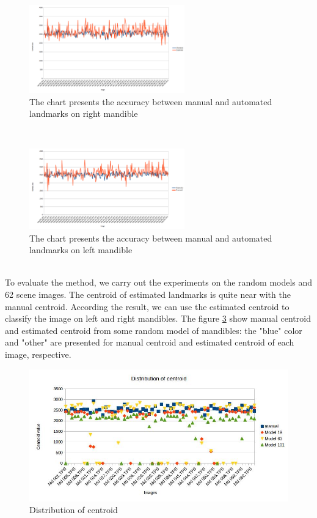 \begin{figure}[h]
\centering
\includegraphics[width=0.6\textwidth]{./images/MdChart}
\caption{The chart presents the accuracy between manual and automated landmarks on right mandible}
\label{figMdChart}
\end{figure}~\\
\begin{figure}[h]
\centering
\includegraphics[width=0.6\textwidth]{./images/MgChart}
\caption{The chart presents the accuracy between manual and automated landmarks on left mandible}
\label{figMgChart}
\end{figure}~\\
To evaluate the method, we carry out the experiments on the random models and 62 scene images. The centroid of estimated landmarks is quite near with the manual centroid. According the result, we can use the estimated centroid to classify the image on left and right mandibles. The figure \ref{figstatistic1} show manual centroid and estimated centroid from some random model of mandibles: the "blue" color and "other" are presented for manual centroid and estimated centroid of each image, respective.
\begin{figure}[h!]
	\centering
	\includegraphics[scale=0.6]{images/statistic1}
	\caption{Distribution of centroid}
	\label{figstatistic1}
\end{figure}\\
